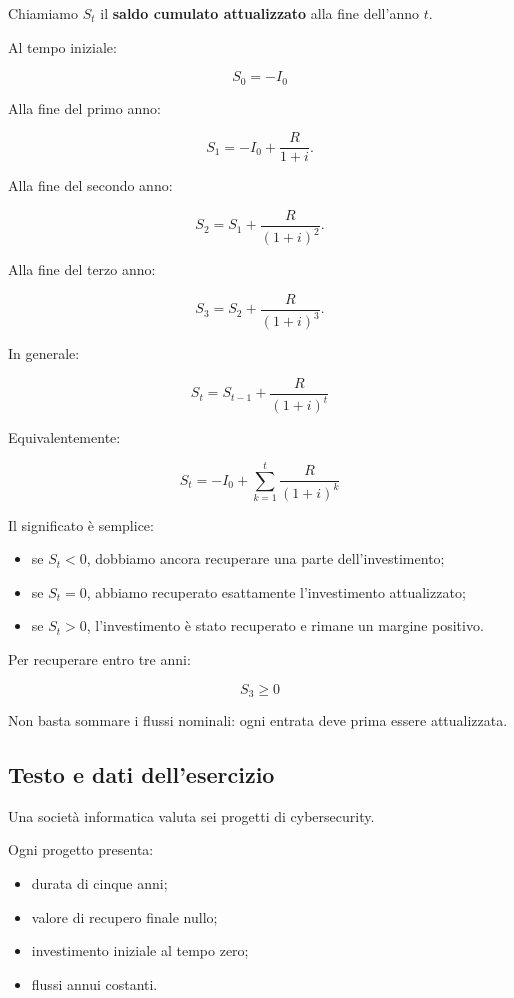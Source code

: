 \noindent Chiamiamo $S_t$
il \textbf{saldo cumulato attualizzato}
alla fine dell'anno $t$.

\noindent Al tempo iniziale:

\[
\boxed{S_0=-I_0}
\]

\noindent Alla fine del primo anno:

\[
S_1=-I_0+\frac{R}{1+i}.
\]

\noindent Alla fine del secondo anno:

\[
S_2=S_1+\frac{R}{(1+i)^2}.
\]

\noindent Alla fine del terzo anno:

\[
S_3=S_2+\frac{R}{(1+i)^3}.
\]

\noindent In generale:

\[
\boxed{
S_t=S_{t-1}+\frac{R}{(1+i)^t}
}
\]

\noindent Equivalentemente:

\[
\boxed{
S_t=-I_0+\sum_{k=1}^{t}
\frac{R}{(1+i)^k}
}
\]

\noindent Il significato è semplice:

\begin{itemize}
    \item se $S_t<0$,
    dobbiamo ancora recuperare
    una parte dell'investimento;

    \item se $S_t=0$,
    abbiamo recuperato esattamente
    l'investimento attualizzato;

    \item se $S_t>0$,
    l'investimento è stato recuperato
    e rimane un margine positivo.
\end{itemize}

\noindent Per recuperare entro tre anni:

\[
\boxed{S_3\geq0}
\]

\noindent Non basta sommare
i flussi nominali:
ogni entrata deve prima
essere attualizzata.


\subsection{Testo e dati dell'esercizio}

\noindent Una società informatica valuta
sei progetti di cybersecurity.

\noindent Ogni progetto presenta:

\begin{itemize}
    \item durata di cinque anni;
    \item valore di recupero finale nullo;
    \item investimento iniziale al tempo zero;
    \item flussi annui costanti.
\end{itemize}

